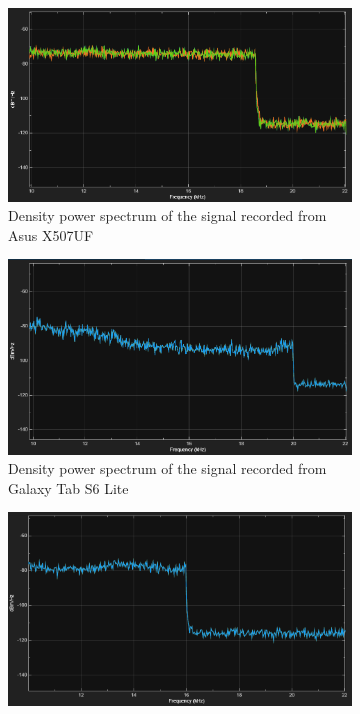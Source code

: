 \begin{figure}[h]
    \centering
    \begin{subfigure}{0.48\textwidth}
  \includegraphics[width = \linewidth]{LiveAudioWatermarking/images/FRwindowsAsus.png}
    \caption{Density power spectrum of the signal recorded from Asus X507UF}
    \label{fig:FRwindows}
    \end{subfigure}
    \hfill
     \begin{subfigure}{0.48\textwidth}
      \includegraphics[width = \linewidth]{LiveAudioWatermarking/images/FRsamsung.png}
    \caption{Density power spectrum of the signal recorded from Galaxy Tab S6 Lite}
    \label{fig:FRsamsung}
    \end{subfigure}%
    \hfill
     \begin{subfigure}{0.48\textwidth}
    \includegraphics[width = \linewidth]{LiveAudioWatermarking/images/FRiphone14.png}

\end{subfigure}
\end{figure}
